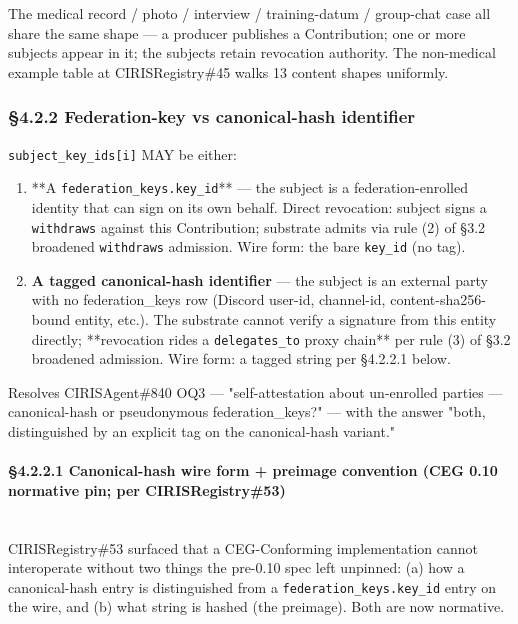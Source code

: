 \documentclass[11pt]{article}
\begin{document}
The medical record / photo / interview / training-datum / group-chat case all share the same shape — a producer publishes a Contribution; one or more subjects appear in it; the subjects retain revocation authority. The non-medical example table at CIRISRegistry\#45 walks 13 content shapes uniformly.


\subsubsection*{§4.2.2 Federation-key vs canonical-hash identifier}


\texttt{subject\_key\_ids[i]} MAY be either:


\begin{enumerate}\setlength\itemsep{0pt}
\item **A \texttt{federation\_keys.key\_id}** — the subject is a federation-enrolled identity that can sign on its own behalf. Direct revocation: subject signs a \texttt{withdraws} against this Contribution; substrate admits via rule (2) of §3.2 broadened \texttt{withdraws} admission. Wire form: the bare \texttt{key\_id} (no tag).
\item \textbf{A tagged canonical-hash identifier} — the subject is an external party with no federation\_keys row (Discord user-id, channel-id, content-sha256-bound entity, etc.). The substrate cannot verify a signature from this entity directly; **revocation rides a \texttt{delegates\_to} proxy chain** per rule (3) of §3.2 broadened admission. Wire form: a tagged string per §4.2.2.1 below.
\end{enumerate}


Resolves CIRISAgent\#840 OQ3 — "self-attestation about un-enrolled parties — canonical-hash or pseudonymous federation\_keys?" — with the answer "both, distinguished by an explicit tag on the canonical-hash variant."


\paragraph{§4.2.2.1 Canonical-hash wire form + preimage convention (CEG 0.10 normative pin; per CIRISRegistry\#53)}\mbox{}\\


CIRISRegistry\#53 surfaced that a CEG-Conforming implementation cannot interoperate without two things the pre-0.10 spec left unpinned: (a) how a canonical-hash entry is distinguished from a \texttt{federation\_keys.key\_id} entry on the wire, and (b) what string is hashed (the preimage). Both are now normative.
\end{document}
